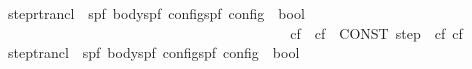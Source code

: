 \begin{isabellebody}
\ {\isachardoublequoteopen}step{\isacharunderscore}rtrancl{\isachardoublequoteclose}\ {\isacharcolon}{\isacharcolon}\ {\isachardoublequoteopen}{\isacharbrackleft}{\isacharparenleft}{\isacharprime}s{\isacharcomma}{\isacharprime}p{\isacharcomma}{\isacharprime}f{\isacharparenright}\ body{\isacharcomma}{\isacharparenleft}{\isacharprime}s{\isacharcomma}{\isacharprime}p{\isacharcomma}{\isacharprime}f{\isacharparenright}\ config{\isacharcomma}{\isacharparenleft}{\isacharprime}s{\isacharcomma}{\isacharprime}p{\isacharcomma}{\isacharprime}f{\isacharparenright}\ config{\isacharbrackright}\ {\isasymRightarrow}\ bool{\isachardoublequoteclose}\isanewline
\ \ \ \ \ \ \ \ \ \ \ \ \ \ \ \ \ \ \ \ \ \ \ \ \ \ \ \ \ \ \ \ {\isacharparenleft}{\isachardoublequoteopen}{\isacharunderscore}{\isasymturnstile}\ {\isacharparenleft}{\isacharunderscore}\ {\isasymrightarrow}\isactrlsup {\isacharasterisk}{\isacharslash}\ {\isacharunderscore}{\isacharparenright}{\isachardoublequoteclose}\ {\isacharbrackleft}{}{}{\isacharcomma}{}{}{\isacharcomma}{}{}{\isacharbrackright}\ {}{}{}{\isacharparenright}\isanewline
\ \isanewline
\ \ {\isachardoublequoteopen}{\isasymGamma}{\isasymturnstile}cf{}\ {\isasymrightarrow}\isactrlsup {\isacharasterisk}\ cf{}\ {\isasymequiv}\ {\isacharparenleft}CONST\ step\ {\isasymGamma}{\isacharparenright}\isactrlsup {\isacharasterisk}\isactrlsup {\isacharasterisk}\ cf{}\ cf{}{\isachardoublequoteclose}\isanewline
{}\isamarkupfalse%
\ \isanewline
\ {\isachardoublequoteopen}step{\isacharunderscore}trancl{\isachardoublequoteclose}\ {\isacharcolon}{\isacharcolon}\ {\isachardoublequoteopen}{\isacharbrackleft}{\isacharparenleft}{\isacharprime}s{\isacharcomma}{\isacharprime}p{\isacharcomma}{\isacharprime}f{\isacharparenright}\ body{\isacharcomma}{\isacharparenleft}{\isacharprime}s{\isacharcomma}{\isacharprime}p{\isacharcomma}{\isacharprime}f{\isacharparenright}\ config{\isacharcomma}{\isacharparenleft}{\isacharprime}s{\isacharcomma}{\isacharprime}p{\isacharcomma}{\isacharprime}f{\isacharparenright}\ config{\isacharbrackright}\ {\isasymRightarrow}\ bool{\isachardoublequoteclose}\isanewline
\ \ \ \ \ \ \ \ \ \ \ \ \ \ \ \ \ \ \ \ \ \ \ \ \ \ \ \ \ \ \ \ {\isacharparenleft}{\isachardoublequoteopen}{\isacharunderscore}{\isasymturnstile}\ {\isacharparenleft}{\isacharunderscore}\ {\isasymrightarrow}\isactrlsup {\isacharplus}{\isacharslash}\ {\isacharunderscore}{\isacharparenright}{\isachardoublequoteclose}\ {\isacharbrackleft}{}{}{\isacharcomma}{}{}{\isacharcomma}{}{}{\isacharbrackright}\ {}{}{}{\isacharparenright}\isanewline

\end{isabellebody}
